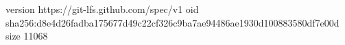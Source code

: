 version https://git-lfs.github.com/spec/v1
oid sha256:d8e4d26fadba175677d49c22cf326c9ba7ae94486ae1930d100883580df7e00d
size 11068

